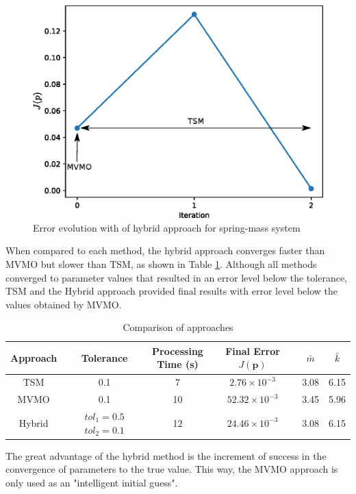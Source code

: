 \begin{figure}[h]
	\caption{Error evolution with of hybrid approach for spring-mass system}
	\begin{center}
		\includegraphics[scale=0.7]{Images/Hybrid_conv_.eps}
	\end{center}
	\label{fig: Hybrid_conv}
\end{figure}

When compared to each method, the hybrid approach converges faster than MVMO but slower than TSM, as shown in Table \ref{tab: SM}. Although all methods converged to parameter values that resulted in an error level below the tolerance, TSM and the Hybrid approach provided final results with error level below the values obtained by MVMO.

\begin{table}[H]
	\caption{Comparison of approaches}
	\begin{center}
	\begin{tabular}{c|ccccc}
		Approach & Tolerance & \shortstack{Processing \\ Time (s)} & \shortstack{Final Error \\ $J(\mathbf{p})$} & $\bar{m}$ & $\bar{k}$ \\
		\hline
		TSM  & 0.1 & 7  & $2.76\times 10^{-3}$ & 3.08 & 6.15 \\
		MVMO  & 0.1 & 10 & $52.32\times 10^{-3}$ & 3.45 & 5.96 \\
		Hybrid  & \shortstack{$tol_{1}=0.5$ \\ $tol_{2}=0.1$} & 12 & $24.46\times 10^{-3}$ & 3.08 & 6.15
	\end{tabular}
	\end{center}
	\label{tab: SM}
\end{table}

The great advantage of the hybrid method is the increment of success in the convergence of parameters to the true value. This way, the MVMO approach is only used as an "intelligent initial guess".
